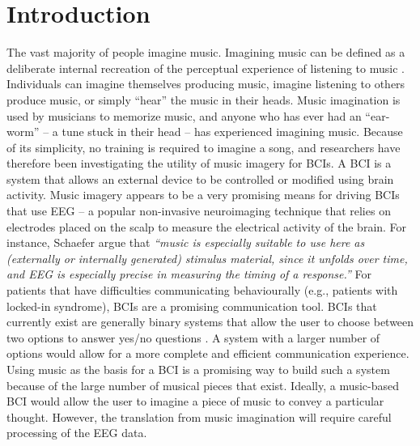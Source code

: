 \chapter{Introduction}

The vast majority of people imagine music. 
Imagining music can be defined as a deliberate internal recreation of the perceptual experience of listening to music \cite{schaefer_name_2011}.
Individuals can imagine themselves producing music, imagine listening to others produce music, or simply ``hear'' the music in their heads. 
Music imagination is used by musicians to memorize music, and anyone who has ever had an ``ear-worm'' -- a tune stuck in their head -- has experienced imagining music. 
Because of its simplicity, no training is required to imagine a song, and researchers have therefore been investigating the utility of music imagery for \acp{BCI}.
A \ac{BCI} is a system that allows an external device to be controlled or modified using brain activity. 
Music imagery appears to be a very promising means for driving \acp{BCI} that use \ac{EEG} -- a popular non-invasive neuroimaging technique that relies on electrodes placed on the scalp to measure the electrical activity of the brain.
For instance, Schaefer \etal\citeyear{schaefer_measuring_2011} argue that
\emph{``music is especially suitable to use here as (externally or internally generated) stimulus material, since it unfolds over time, and \ac{EEG} is especially precise in measuring the timing of a response.''}
For patients that have difficulties communicating behaviourally (e.g., patients with locked-in syndrome), \ac{BCI}s are a promising communication tool. 
{BCI}s that currently exist are generally binary systems that allow the user to choose between two options to answer yes/no questions \cite{Monti2010}.
A system with a larger number of options would allow for a more complete and efficient communication experience. 
Using music as the basis for a \ac{BCI} is a promising way to build such a system because of the large number of musical pieces that exist. 
Ideally, a music-based \ac{BCI} would allow the user to imagine a piece of music to convey a particular thought. 
However, the translation from music imagination will require careful processing of the EEG data. 

